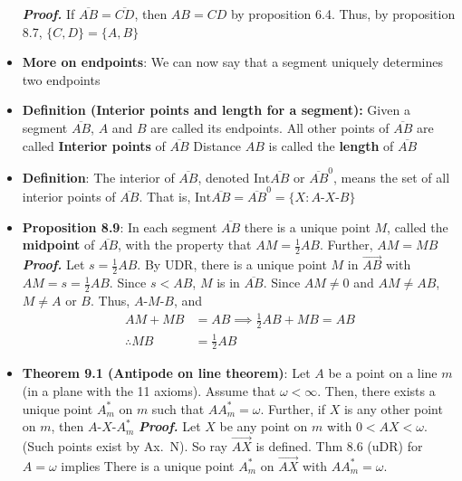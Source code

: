 \documentclass{report}
\begin{document}
\begin{itemize}
            \textbf{\textit{Proof.}} If $\overline{AB} = \overline{CD}$, then $ AB = CD$ by proposition 6.4.
            \bigbreak \noindent 
            Thus, by proposition 8.7, $\{C,D\} = \{A,B\} $ \endpf
        \item \textbf{More on endpoints}: We can now say that a segment uniquely determines two endpoints
        \item \textbf{Definition (Interior points and length for a segment):} Given a segment $ \overline{AB}$, $A$ and $B$ are called its endpoints. All other points of $\overline{AB}$ are called \textbf{Interior points} of $\overline{AB}$
            \bigbreak \noindent 
            Distance $AB$ is called the \textbf{length} of $\overline{AB} $
        \item \textbf{Definition}: The interior of $\overline{AB}$, denoted $\text{Int}\overline{AB}$ or $\overline{AB}^{0}$, means the set of all interior points of $\overline{AB}$. That is, $\text{Int}\overline{AB} = \overline{AB}^{0} = \{X: A\text{-}X\text{-}B\}$
        \item \textbf{Proposition 8.9}: In each segment $\overline{AB}$ there is a unique point $M$, called the \textbf{midpoint} of $\overline{AB} $, with the property that $AM = \frac{1}{2}AB$. Further, $AM = MB $
            \bigbreak \noindent 
            \textbf{\textit{Proof.}} Let $s = \frac{1}{2}AB$. By UDR, there is a unique point $M$ in $\overrightarrow{AB}$ with $AM = s = \frac{1}{2}AB$. Since $s < AB$, $M$ is in $\overline{AB} $. Since $AM \ne 0$ and $AM \ne AB$, $M \ne A$ or $B$. Thus, $ A\text{-}M\text{-}B$, and
            \begin{align*}
                AM + MB &= AB \implies \frac{1}{2}AB + MB = AB \\
                \therefore MB &= \frac{1}{2}AB
            \end{align*}
            \endpf
        \item \textbf{Theorem 9.1 (Antipode on line theorem)}: Let $A$ be a point on a line $m$ (in a plane with the 11 axioms). Assume that $\omega < \infty$. Then, there exists a unique point $A^{*}_{m}$ on $m$ such that $AA_{m}^{*} = \omega$. Further, if $X$ is any other point on $m$, then $ A\text{-}X\text{-}A^{*}_{m} $
            \bigbreak \noindent 
            \textbf{\textit{Proof.}}
            Let \( X \) be any point on \( m \) with \( 0 < AX < \omega \).
            (Such points exist by Ax.~N). So ray \( \overrightarrow{AX} \) is defined.
            \bigbreak \noindent 
            Thm 8.6 (uDR) for \( A = \omega \) implies There is a unique point \( A_m^* \) on \( \overrightarrow{AX} \) with \( AA_m^* = \omega \).

\end{itemize}
\end{document}
